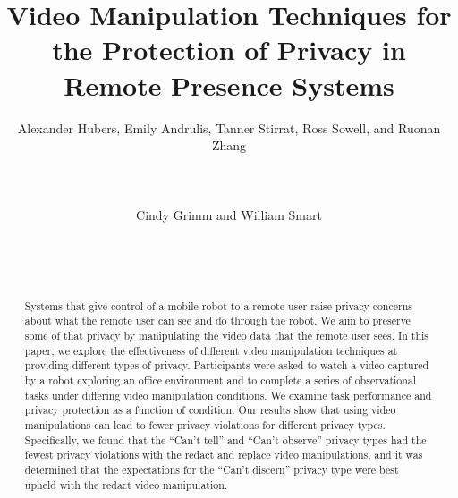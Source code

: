 \documentclass{acm_proc_article-sp}
\begin{document}
\title{Video Manipulation Techniques for the Protection of Privacy in Remote Presence Systems}

\author{
\alignauthor Alexander Hubers, Emily Andrulis, Tanner Stirrat, Ross Sowell, and  Ruonan Zhang\\
       \\
       \\
       \\
\alignauthor Cindy Grimm and William Smart\\
       \\
       \\
       \\
}


\maketitle
\begin{abstract}
Systems that give control of a mobile robot to a remote user raise privacy concerns about what the remote user can see and do through the robot.  We aim to preserve some of that privacy by manipulating the video data that the remote user sees.  In this paper, we explore the effectiveness of different video manipulation techniques at providing different types of privacy.  Participants were asked to watch a video captured by a robot exploring an office environment and to complete a series of observational tasks under differing video manipulation conditions.  We examine task performance and privacy protection as a function of condition. Our results show that using video manipulations can lead to fewer privacy violations for different privacy types. Specifically, we found that the ``Can't tell'' and  ``Can't observe'' privacy types had the fewest privacy violations with the redact and replace video manipulations, and it was determined that the expectations for the ``Can't discern'' privacy type were best upheld with the redact video manipulation.
\end{abstract}
\end{document}
